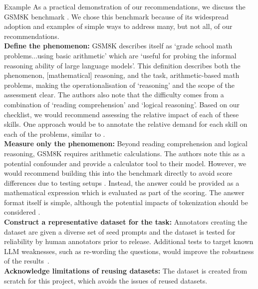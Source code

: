 
\begin{examplebox}{Example}
As a practical demonstration of our recommendations, we discuss the GSM8K benchmark \cite{cobbe_training_2021}. We chose this benchmark because of its widespread adoption and examples of simple ways to address many, but not all, of our recommendations.\\

\textbf{Define the phenomenon:} 
GSM8K describes itself as `grade school math problems...using basic arithmetic' which are `useful for probing the informal reasoning ability
 of large language models'. This definition describes both the phenomenon, [mathematical] reasoning, and the task, arithmetic-based math problems, making the operationalisation of `reasoning' and the scope of the assessment clear. The authors also note that the difficulty comes from a combination of `reading comprehension' and `logical reasoning'. Based on our checklist, we would recommend assessing the relative impact of each of these skills. One approach would be to annotate the relative demand for each skill on each of the problems, similar to \citeauthor{zhou2025general} \cite{zhou2025general}.\\

\textbf{Measure only the phenomenon:} 
Beyond reading comprehension and logical reasoning, GSM8K requires arithmetic calculations. The authors note this as a potential confounder and provide a calculator tool to their model. However, we would recommend building this into the benchmark directly to avoid score differences due to testing setups \cite{bidermanLessonsTrenchesReproducible2024a}. Instead, the answer could be provided as a mathematical expression which is evaluated as part of the scoring. The answer format itself is simple, although the potential impacts of tokenization should be considered \cite{singh2024tokenization}.\\

\textbf{Construct a representative dataset for the task:} 
Annotators creating the dataset are given a diverse set of seed prompts and the dataset is tested for reliability by human annotators prior to release. Additional tests to target known LLM weaknesses, such as re-wording the questions, would improve the robustness of the results~\cite{mirzadehGSMSymbolicUnderstandingLimitations2024}.\\

\textbf{Acknowledge limitations of reusing datasets:} 
The dataset is created from scratch for this project, which avoids the issues of reused datasets.\\


\end{examplebox}
